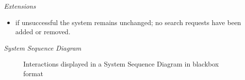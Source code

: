 \textsl{Extensions}
\begin{itemize}[noitemsep]
	\item if unsuccessful the system remains unchanged; no search requests have been added or removed.
\end{itemize}
\textsl{System Sequence Diagram}
\begin{figure}[H]
	\centering
	\caption*{Interactions displayed in a System Sequence Diagram in blackbox format}
\end{figure}